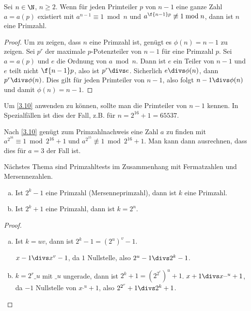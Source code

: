 \begin{st}[Lucas] \label{3.10}
	Sei $n \in \N$, $n \ge 2$.
	Wenn für jeden Primteiler $p$ von $n - 1$ eine ganze Zahl $a = a(p)$ existiert mit $a^{n-1} \equiv 1 \bmod n$ und $a^{\f {n-1}p} \not \equiv 1 \bmod n$, dann ist $n$ eine Primzahl.

	\begin{proof}
		Um zu zeigen, dass $n$ eine Primzahl ist, genügt es $\phi(n) = n - 1$ zu zeigen.
		Sei $p^r$ der maximale $p$-Potenzteiler von $n-1$ für eine Primzahl $p$.
		Sei $a = a(p)$ und $e$ die Ordnung von $a \bmod n$.
		Dann ist $e$ ein Teiler von $n-1$ und $e$ teilt nicht $\f {n-1}p$, also ist $p^r \divs e$.
		Sicherlich $e \divs \phi(n)$, dann $p^r \divs \phi(n)$.
		Dies gilt für jeden Primteiler von $n-1$, also folgt $n - 1 \divs \phi(n)$ und damit $\phi(n) = n-1$.
	\end{proof}
\end{st}

\begin{nt} \label{3.11}
	Um \ref{3.10} anwenden zu können, sollte man die Primteiler von $n-1$ kennen.
	In Spezialfällen ist dies der Fall, z.B. für $n = 2^{16} + 1 = 65537$.

	Nach \ref{3.10} genügt zum Primzahlnachweis eine Zahl $a$ zu finden mit $a^{2^{16}} \equiv 1 \bmod 2^{16} + 1$ und $a^{2^{15}} \not\equiv 1 \bmod 2^{16} + 1$.
	Man kann dann ausrechnen, dass dies für $a = 3$ der Fall ist.
\end{nt}

Nächstes Thema sind Primzahltests im Zusammenhang mit Fermatzahlen und Mersennezahlen.

\begin{lem} \label{3.12}
	\begin{enumerate}[a)]
		\item
			Ist $2^k - 1$ eine Primzahl (Mersenneprimzahl), dann ist $k$ eine Primzahl.
		\item
			Ist $2^k + 1$ eine Primzahl, dann ist $k = 2^n$.
	\end{enumerate}
	\begin{proof}
		\begin{enumerate}[a)]
			\item
				Ist $k = uv$, dann ist $2^k - 1 = (2^u)^v - 1$.

				$x-1 \divs x^v - 1$, da $1$ Nullstelle, also $2^u -1 \divs 2^k - 1$.
			\item
				$k = 2^r \_ u$ mit $\_ u$ ungerade, dann ist $2^k + 1 = (2^{2^r})^u + 1$.
				$x + 1 \divs x^{\_ u} + 1$, da $-1$ Nullstelle von $x^{\_ u} + 1$, also $2^{2^r} + 1 \divs 2^k + 1$.
		\end{enumerate}
	\end{proof}
\end{lem}

